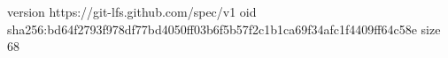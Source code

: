 version https://git-lfs.github.com/spec/v1
oid sha256:bd64f2793f978df77bd4050ff03b6f5b57f2c1b1ca69f34afc1f4409ff64c58e
size 68
